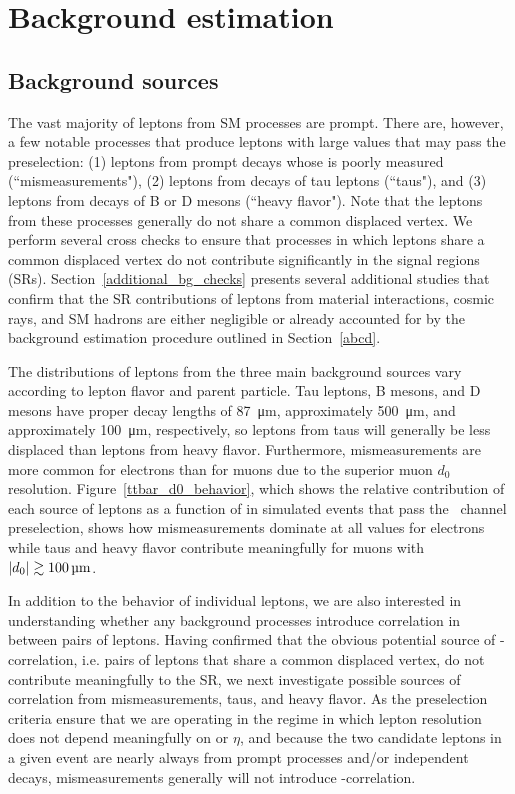 \section{Background estimation}
\label{bg}
\subsection{Background sources}
\label{bg_sources}
The vast majority of leptons from SM processes are prompt. There are, however, a few notable processes that produce leptons with large \ad values that may pass the preselection: (1) leptons from prompt decays whose \ad is poorly measured (``mismeasurements"), (2) leptons from  decays of tau leptons (``taus"), and (3) leptons from decays of B or D mesons (``heavy flavor"). Note that the leptons from these processes generally do not share a common displaced vertex. We perform several cross checks to ensure that processes in which leptons share a common displaced vertex do not contribute significantly in the signal regions (SRs). Section~\ref{additional_bg_checks} presents several additional studies that confirm that the SR contributions of leptons from material interactions, cosmic rays, and SM hadrons are either negligible or already accounted for by the background estimation procedure outlined in Section~\ref{abcd}.

The \ad distributions of leptons from the three main background sources vary according to lepton flavor and parent particle. Tau leptons, B mesons, and D mesons have proper decay lengths of \SI{87}{\um}, approximately \SI{500}{\um}, and approximately \linebreak[4]\SI{100}{\um}, respectively, so leptons from taus will generally be less displaced than leptons from heavy flavor. Furthermore, mismeasurements are more common for electrons than for muons due to the superior muon $d_0$ resolution. Figure~\ref{ttbar_d0_behavior}, which shows the relative contribution of each source of leptons as a function of \ad in simulated \ttbar events that pass the \Pe\Pgm\ channel preselection, shows how mismeasurements dominate at all \ad values for electrons while taus and heavy flavor contribute meaningfully for muons with $\ad\gtrsim\SI{100}{\um}$.



In addition to the \ad behavior of individual leptons, we are also interested in understanding whether any background processes introduce correlation in \ad between pairs of leptons. Having confirmed that the obvious potential source of \ad-\ad correlation, i.e. pairs of leptons that share a common displaced vertex, do not contribute meaningfully to the SR, we next investigate possible sources of correlation from mismeasurements, taus, and heavy flavor. As the preselection criteria ensure that we are operating in the regime in which lepton \ad resolution does not depend meaningfully on \pt or $\eta$, and because the two candidate leptons in a given event are nearly always from prompt processes and/or independent decays, mismeasurements generally will not introduce \ad-\ad correlation.

